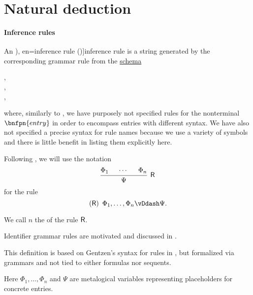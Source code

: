 \section{Natural deduction}\label{sec:natural_deduction}

\paragraph{Inference rules}

\begin{definition}\label{def:inference_rule}\mimprovised
  An \term[ru=правило вывода (\cite[31]{Герасимов2011Вычислимость}), en=inference rule (\cite[2]{MartinLöf1996Meanings})]{inference rule} is a string generated by the corresponding grammar rule from the \hyperref[def:formal_grammar/schema]{schema}
  \begin{bnf*}
         { \bnfor {} \bnfsp \bnftsq{,} \bnfsp {}}, \\
           {\bnfes \bnfor {}}, \\
         {}, \\
     {\bnftsq{(} \bnfsp {} \bnfsp \bnftsq{)} \bnfsp {} \bnfsp \bnftsq{\( \vDdash \)} \bnfsp {}}
  \end{bnf*}
  where, similarly to , we have purposely not specified rules for the nonterminal \( \bnfpn{entry} \) in order to encompass entries with different syntax. We have also not specified a precise syntax for rule names because we use a variety of symbols and there is little benefit in listing them explicitly here.

  Following , we will use the notation
  \begin{equation*}
    \begin{prooftree}
      \hypo{ \Phi_1 }
      \hypo{ \cdots }
      \hypo{ \Phi_n }
      \infer3[\logic{R}]{ \Psi }
    \end{prooftree}
  \end{equation*}
  for the rule
  \begin{equation*}
    (\logic{R}) \enspace \Phi_1, \ldots, \Phi_n \vDdash \Psi.
  \end{equation*}

  We call \( n \) the  of the rule \( \textsf{R} \).
\end{definition}
\begin{comments}
  \item Identifier grammar rules are motivated and discussed in .

  \item This definition is based on Gentzen's syntax for rules in \cite[181]{Gentzen1935LogischeSchließen}, but formalized via grammars and not tied to either formulas nor sequents.

  \item Here \( \Phi_1, \ldots, \Phi_n \) and \( \Psi \) are metalogical variables representing placeholders for concrete entries.
\end{comments}

